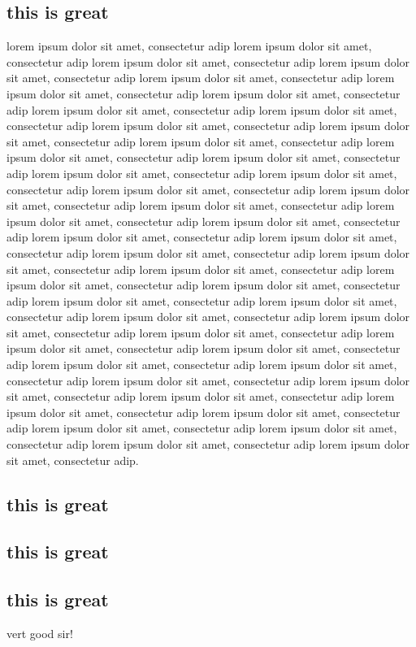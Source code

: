 \subsection{this is great}
lorem ipsum dolor sit amet, consectetur adip lorem ipsum dolor sit amet, consectetur adip lorem ipsum dolor sit amet, consectetur adip lorem ipsum dolor sit amet, consectetur adip lorem ipsum dolor sit amet, consectetur adip lorem ipsum dolor sit amet, consectetur adip lorem ipsum dolor sit amet, consectetur adip lorem ipsum dolor sit amet, consectetur adip lorem ipsum dolor sit amet, consectetur adip lorem ipsum dolor sit amet, consectetur adip lorem ipsum dolor sit amet, consectetur adip lorem ipsum dolor sit amet, consectetur adip lorem ipsum dolor sit amet, consectetur adip lorem ipsum dolor sit amet, consectetur adip lorem ipsum dolor sit amet, consectetur adip lorem ipsum dolor sit amet, consectetur adip lorem ipsum dolor sit amet, consectetur adip lorem ipsum dolor sit amet, consectetur adip lorem ipsum dolor sit amet, consectetur adip lorem ipsum dolor sit amet, consectetur adip lorem ipsum dolor sit amet, consectetur adip lorem ipsum dolor sit amet, consectetur adip lorem ipsum dolor sit amet, consectetur adip lorem ipsum dolor sit amet, consectetur adip lorem ipsum dolor sit amet, consectetur adip lorem ipsum dolor sit amet, consectetur adip lorem ipsum dolor sit amet, consectetur adip lorem ipsum dolor sit amet, consectetur adip lorem ipsum dolor sit amet, consectetur adip lorem ipsum dolor sit amet, consectetur adip lorem ipsum dolor sit amet, consectetur adip lorem ipsum dolor sit amet, consectetur adip lorem ipsum dolor sit amet, consectetur adip lorem ipsum dolor sit amet, consectetur adip lorem ipsum dolor sit amet, consectetur adip lorem ipsum dolor sit amet, consectetur adip lorem ipsum dolor sit amet, consectetur adip lorem ipsum dolor sit amet, consectetur adip lorem ipsum dolor sit amet, consectetur adip lorem ipsum dolor sit amet, consectetur adip lorem ipsum dolor sit amet, consectetur adip lorem ipsum dolor sit amet, consectetur adip lorem ipsum dolor sit amet, consectetur adip lorem ipsum dolor sit amet, consectetur adip lorem ipsum dolor sit amet, consectetur adip lorem ipsum dolor sit amet, consectetur adip.
\subsection{this is great}
\subsection{this is great}
\subsection{this is great}
vert good sir!


